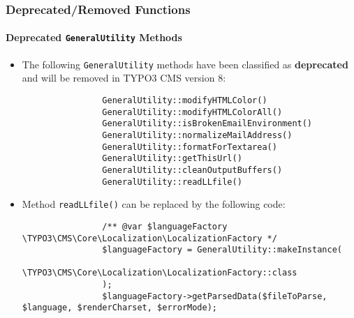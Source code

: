 \begin{frame}[fragile]
	\frametitle{Deprecated/Removed Functions}
	\framesubtitle{Deprecated \texttt{GeneralUtility} Methods}

	\lstset{basicstyle=\tiny\ttfamily}

	\begin{itemize}
		\item The following \texttt{GeneralUtility} methods have been classified as \textbf{deprecated}
			and will be removed in TYPO3 CMS version 8:

			\begin{lstlisting}
				GeneralUtility::modifyHTMLColor()
				GeneralUtility::modifyHTMLColorAll()
				GeneralUtility::isBrokenEmailEnvironment()
				GeneralUtility::normalizeMailAddress()
				GeneralUtility::formatForTextarea()
				GeneralUtility::getThisUrl()
				GeneralUtility::cleanOutputBuffers()
				GeneralUtility::readLLfile()
			\end{lstlisting}

		\item Method \texttt{readLLfile()} can be replaced by the following code:

			\begin{lstlisting}
				/** @var $languageFactory \TYPO3\CMS\Core\Localization\LocalizationFactory */
				$languageFactory = GeneralUtility::makeInstance(
				  \TYPO3\CMS\Core\Localization\LocalizationFactory::class
				);
				$languageFactory->getParsedData($fileToParse, $language, $renderCharset, $errorMode);
			\end{lstlisting}

	\end{itemize}

\end{frame}


